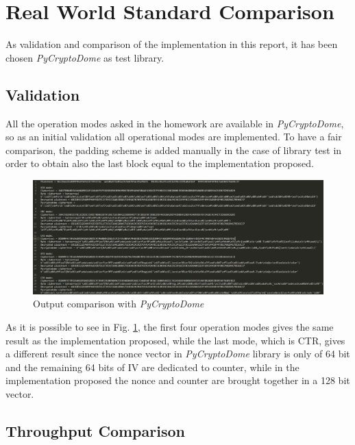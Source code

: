 \documentclass{article}
\begin{document}

\section{Real World Standard Comparison}

As validation and comparison of the implementation in this report, it has been chosen \textit{PyCryptoDome} as test library. 

\subsection{Validation}

All the operation modes asked in the homework are available in \textit{PyCryptoDome}, so as an initial validation all operational modes are implemented. To have a fair comparison, the padding scheme is added manually in the case of library test in order to obtain also the last block equal to the implementation proposed. 

\begin{figure}[H]
\centering
\includegraphics[width=1\linewidth]{images/output_comparison.png}
\caption{Output comparison with  \textit{PyCryptoDome}}
\label{fig:outputComparison}
\end{figure}

As it is possible to see in Fig. \ref{fig:outputComparison}, the first four operation modes gives the same result as the implementation proposed, while the last mode, which is CTR, gives a different result since the nonce vector in \textit{PyCryptoDome} library is only of 64 bit and the remaining 64 bits of IV are dedicated to counter, while in the implementation proposed the nonce and counter are brought together in a 128 bit vector.

\subsection{Throughput Comparison}
\end{document}
